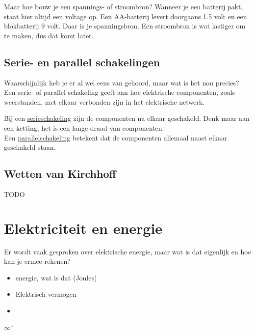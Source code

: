 Maar hoe bouw je een spannings- of stroombron? Wanneer je een batterij pakt, staat hier altijd een voltage op. Een AA-batterij levert doorgaans 1.5 volt en een blokbatterij 9 volt. Daar is je spanningsbron. Een stroombron is wat lastiger om te maken, dus dat komt later. \\

\subsection{Serie- en parallel schakelingen}
Waarschijnlijk heb je er al wel eens van gehoord, maar wat is het nou precies? Een serie- of parallel schakeling geeft aan hoe elektrische componenten, zoals weerstanden, met elkaar verbonden zijn in het elektrische netwerk.

Bij een \href{https://nl.wikipedia.org/wiki/Serieschakeling}{serieschakeling} zijn de componenten na elkaar geschakeld. Denk maar aan een ketting, het is een lange draad van componenten. \\

Een \href{https://nl.wikipedia.org/wiki/Parallelschakeling}{parallelschakeling} betekent dat de componenten allemaal naast elkaar geschakeld staan. 

\subsection{Wetten van Kirchhoff}
TODO

\section{Elektriciteit en energie}
Er wordt vaak gesproken over elektrische energie, maar wat is dat eigenlijk en hoe kan je ermee rekenen? 

\begin{itemize}
	\item energie, wat is dat (Joules)
	\item Elektrisch vermogen
	\item 
\end{itemize}

$\infty ^{\circ}$
